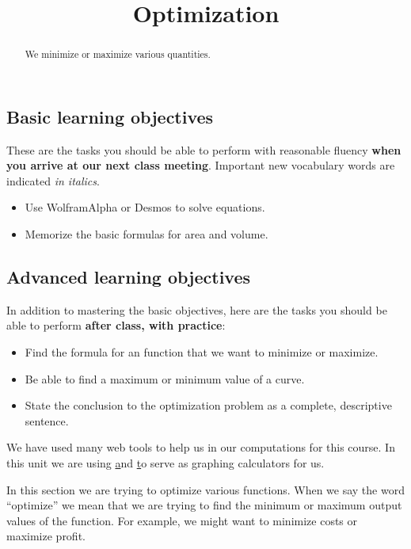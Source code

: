 \documentclass{ximera}
\title{Optimization}
\begin{document}
\begin{abstract}
We minimize or maximize various quantities.
\end{abstract}
\maketitle

\subsection*{Basic learning objectives}

These are the tasks you should be able to perform with reasonable fluency \textbf{when you arrive at our next class meeting}. Important new vocabulary words are indicated \emph{in italics}. 

\begin{itemize}
	\item Use WolframAlpha or Desmos to solve equations.
    \item Memorize the basic formulas for area and volume.
\end{itemize}

\subsection*{Advanced learning objectives}

In addition to mastering the basic objectives, here are the tasks you should be able to perform \textbf{after class, with practice}: 

\begin{itemize}
	\item Find the formula for an function that we want to minimize or maximize.
    \item Be able to find a maximum or minimum value of a curve.
    \item State the conclusion to the optimization problem as a complete, descriptive sentence.
\end{itemize}

\noindent\hrulefill

We have used many web tools to help us in our computations for this course. In this unit we are using \href{http://wolframalpha.com} and \href{http://desmos.com} to serve as graphing calculators for us. 

In this section we are trying to optimize various functions. When we say the word ``optimize'' we mean that we are trying to find the minimum or maximum output values of the function. For example, we might want to minimize costs or maximize profit.
\end{document}
